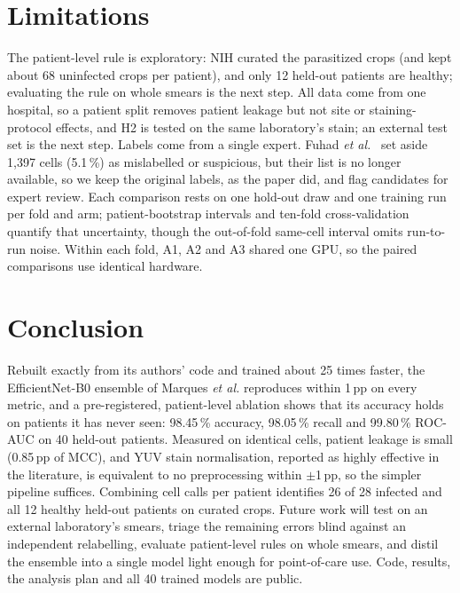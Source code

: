 \documentclass[conference]{IEEEtran}
\begin{document}
\section{Limitations}
The patient-level rule is exploratory: NIH curated the parasitized crops (and kept about 68 uninfected crops per patient), and only 12 held-out patients are healthy; evaluating the rule on whole smears is the next step. All data come from one hospital, so a patient split removes patient leakage but not site or staining-protocol effects, and H2 is tested on the same laboratory's stain; an external test set is the next step. Labels come from a single expert. Fuhad \emph{et al.}~\cite{fuhad2020} set aside 1{,}397 cells (5.1\,\%) as mislabelled or suspicious, but their list is no longer available, so we keep the original labels, as the paper did, and flag candidates for expert review. Each comparison rests on one hold-out draw and one training run per fold and arm; patient-bootstrap intervals and ten-fold cross-validation quantify that uncertainty, though the out-of-fold same-cell interval omits run-to-run noise. Within each fold, A1, A2 and A3 shared one GPU, so the paired comparisons use identical hardware.

\section{Conclusion}
Rebuilt exactly from its authors' code and trained about 25 times faster, the EfficientNet-B0 ensemble of Marques \emph{et al.} reproduces within 1\,pp on every metric, and a pre-registered, patient-level ablation shows that its accuracy holds on patients it has never seen: 98.45\,\% accuracy, 98.05\,\% recall and 99.80\,\% ROC-AUC on 40 held-out patients. Measured on identical cells, patient leakage is small (0.85\,pp of MCC), and YUV stain normalisation, reported as highly effective in the literature, is equivalent to no preprocessing within $\pm$1\,pp, so the simpler pipeline suffices. Combining cell calls per patient identifies 26 of 28 infected and all 12 healthy held-out patients on curated crops. Future work will test on an external laboratory's smears, triage the remaining errors blind against an independent relabelling, evaluate patient-level rules on whole smears, and distil the ensemble into a single model light enough for point-of-care use. Code, results, the analysis plan and all 40 trained models are public.
\end{document}
